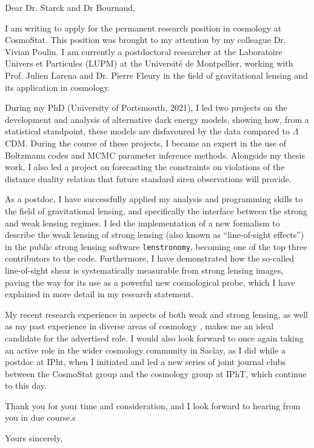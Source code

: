 \documentclass[11pt]{letter}
\begin{document}

\begin{letter}{}
\address{Dr. Natalie B. Hogg,\\ Laboratoire Universe et Particules,\\
Universit\'e de Montpellier,\\
Montpellier, France, 34070.\\
Email: natalie.hogg@lupm.in2p3.fr}

\opening{Dear Dr. Starck and Dr Bournaud,}

I am writing to apply for the permanent research position in cosmology at CosmoStat. This position was brought to my attention by my colleague Dr. Vivian Poulin. I am currently a postdoctoral researcher at the Laboratoire Univers et Particules (LUPM) at the Universit\'e de Montpellier, working with Prof. Julien Larena and Dr. Pierre Fleury in the field of gravitational lensing and its application in cosmology.

During my PhD (University of Portsmouth, 2021), I led two projects on the development and analysis of alternative dark energy models, showing how, from a statistical standpoint, these models are disfavoured by the data compared to $\Lambda$CDM. During the course of these projects, I became an expert in the use of Boltzmann codes and MCMC parameter inference methods. Alongside my thesis work, I also led a project on forecasting the constraints on violations of the distance duality relation that future standard siren observations will provide.

As a postdoc, I have successfully applied my analysis and programming skills to the field of gravitational lensing, and specifically the interface between the strong and weak lensing regimes. I led the implementation of a new formalism to describe the weak lensing of strong lensing (also known as ``line-of-sight effects'') in the public strong lensing software \texttt{lenstronomy}, becoming one of the top three contributors to the code. Furthermore, I have demonstrated how the so-called line-of-sight shear is systematically measurable from strong lensing images, paving the way for its use as a powerful new cosmological probe, which I have explained in more detail in my research statement.

My recent research experience in aspects of both weak and strong lensing, as well as my past experience in diverse areas of cosmology
, makes me an ideal candidate for the advertised role. I would also look forward to once again taking an active role in the wider cosmology community in Saclay, as I did while a postdoc at IPht, when I initiated and led a new series of joint journal clubs between the CosmoStat group and the cosmology group at IPhT, which continue to this day.

Thank you for your time and consideration, and I look forward to hearing from you in due course.s

\signature{Dr. Natalie Hogg}

\closing{Yours sincerely,}


\end{letter}
\end{document}
